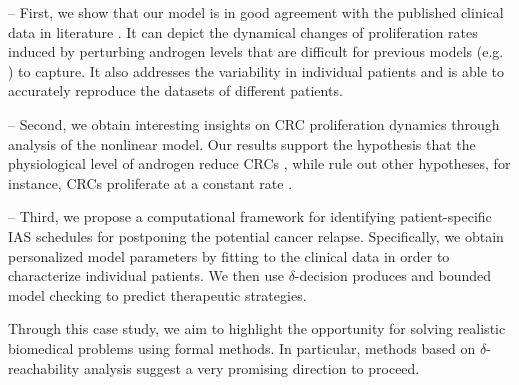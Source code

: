 -- First, we show that our model is in good agreement with the published clinical data in literature \cite{ bruchovsky06,bruchovsky07}. It can depict the dynamical changes of proliferation rates induced by perturbing androgen levels that are difficult for previous models (e.g. \cite{ideta08}) to capture. It also addresses the variability in individual patients and is able to accurately reproduce the datasets of different patients.  

-- Second, we obtain interesting insights on CRC proliferation dynamics through analysis of the nonlinear model. Our results support the hypothesis that the physiological level of androgen reduce CRCs \cite{ideta08}, while rule out other hypotheses, for instance, CRCs proliferate at a constant rate \cite{portz12}. 

-- Third, we propose a computational framework for identifying patient-specific IAS schedules for postponing the potential cancer relapse. Specifically, we obtain personalized model parameters by fitting to the clinical data in order to characterize individual patients. We then use $\delta$-decision produces and bounded model checking to predict therapeutic strategies. 

Through this case study, we aim to highlight the opportunity for solving realistic biomedical problems using formal methods. In particular, methods based on $\delta$-reachability analysis suggest a very promising direction to proceed. \\ 




